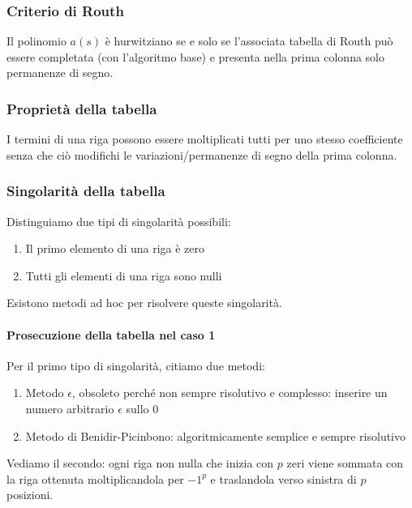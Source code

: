 \documentclass[11pt]{article}
\begin{document}
\subsubsection{Criterio di Routh}
Il polinomio $a(s)$ è hurwitziano se e solo se l'associata tabella di Routh può essere completata (con l'algoritmo base) e presenta nella prima colonna solo permanenze di segno.
\subsubsection{Proprietà della tabella}
I termini di una riga possono essere moltiplicati tutti per uno stesso coefficiente senza che ciò modifichi le variazioni/permanenze di segno della prima colonna.
\subsubsection{Singolarità della tabella}
Distinguiamo due tipi di singolarità possibili:
\begin{enumerate}
    \item Il primo elemento di una riga è zero
    \item Tutti gli elementi di una riga sono nulli
\end{enumerate}
Esistono metodi ad hoc per risolvere queste singolarità.
\paragraph{Prosecuzione della tabella nel caso 1} Per il primo tipo di singolarità, citiamo due metodi:
\begin{enumerate}
    \item Metodo $\epsilon$, obsoleto perché non sempre risolutivo e complesso: inserire un numero arbitrario $\epsilon$ sullo 0
    \item Metodo di Benidir-Picinbono: algoritmicamente semplice e sempre risolutivo
\end{enumerate}
Vediamo il secondo: ogni riga non nulla che inizia con $p$ zeri viene sommata con la riga ottenuta moltiplicandola per $-1^p$ e traslandola verso sinistra di $p$ posizioni.
\end{document}
